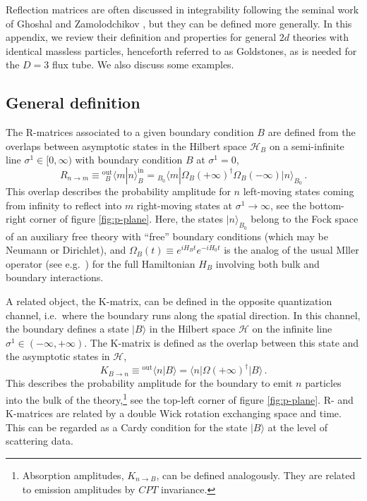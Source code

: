 \documentclass[
 reprint,
 amsmath,
 pre,
 amssymb,
 nofootinbib,
 aps,
 longbibliography,
]{revtex4-1}
\newcommand{\<}{{\langle}}
\renewcommand{\>}{{\rangle}}
\def\o{{\omega}}
\begin{document}
Reflection matrices are often discussed in integrability following the seminal work of Ghoshal and Zamolodchikov \cite{Ghoshal:1993tm}, but they can be defined more generally. In this appendix, we review their definition and properties for general $2d$ theories with identical massless particles, henceforth referred to as Goldstones, as is needed for the $D=3$ flux tube. We also discuss some examples.

\subsection{General definition}
The R-matrices associated to a given boundary condition $B$ are defined from the overlaps between asymptotic states in the Hilbert space $\mathcal H_B$ on a semi-infinite line $\sigma^1\in [0,\infty)$ with boundary condition $B$ at $\sigma^1 = 0$,
\begin{equation}\label{eq:Rn-m}
    R_{n\to m} \equiv {}_{\hspace{5pt}B}^{\text{out}}\langle m | n\rangle^{\text{in}}_B = {}_{B_0}\langle m | \Omega_B(+\infty)^\dagger \Omega_B(-\infty) | n\rangle_{B_0}\,.
\end{equation}
This overlap describes the probability amplitude for $n$ left-moving states coming from infinity to reflect into $m$ right-moving states at $\sigma^1\to \infty$, see the bottom-right corner of figure \ref{fig:p-plane}. Here, the states $|n\rangle_{B_0}$ belong to the Fock space of an auxiliary free theory with ``free'' boundary conditions (which may be Neumann or Dirichlet), and $\Omega_B(t)\equiv e^{iH_Bt}e^{-iH_0t}$ is the analog of the usual M\o ller operator (see e.g.\ \cite{Weinberg:1995mt}) for the full Hamiltonian $H_B$ involving both bulk and boundary interactions.

A related object, the K-matrix, can be defined in the opposite quantization channel, i.e.\ where the boundary runs along the spatial direction. In this channel, the boundary defines a state $|B\rangle$ in the Hilbert space $\mathcal H$ on the infinite line $\sigma^1\in(-\infty,+\infty)$. The K-matrix is defined as the overlap between this state and the asymptotic states in $\mathcal H$,
\begin{equation}
    K_{B\to n} \equiv {}^{\text{out}}\langle n |B\rangle = \langle n | \Omega(+\infty)^\dagger|B\rangle\,.
\end{equation}
This describes the probability amplitude for the boundary to emit $n$ particles into the bulk of the theory,\footnote{Absorption amplitudes, $K_{n\to B}$, can be defined analogously. They are related to emission amplitudes by $CPT$ invariance.} see the top-left corner of figure \ref{fig:p-plane}. R- and K-matrices are related by a double Wick rotation exchanging space and time. This can be regarded as a Cardy condition \cite{Cardy:1989ir} for the state $|B\rangle$ at the level of scattering data.
\end{document}
